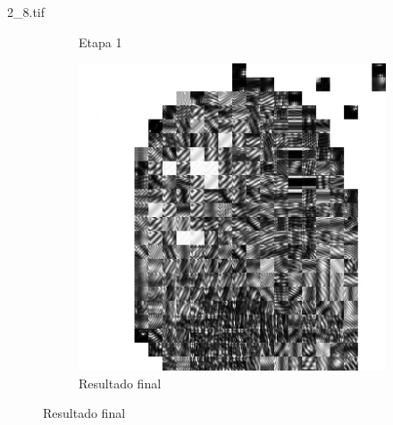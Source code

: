 \documentclass{beamer}
\begin{document}
\begin{frame}{2\_8.tif}
\begin{figure}
\begin{subfigure}[!ht]{0.32\textwidth}
                \caption{Etapa 1}
            \end{subfigure}
            \begin{subfigure}[!ht]{0.32\textwidth}
                \includegraphics[width=\columnwidth]{Fingerprints/2_8_final.jpg}
                \caption{Resultado final}
            \end{subfigure}
        \end{figure}
    \end{frame}

\end{document}
